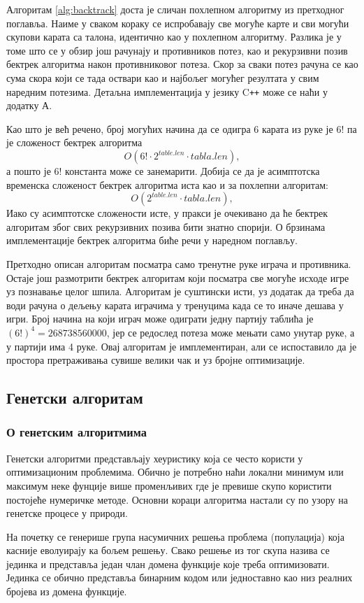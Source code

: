 \documentclass[a4paper, 12pt, ngerman]{article}
\let\oldsubsection\subsection
\renewcommand\subsection{\clearpage\oldsubsection}
\newcommand{\cpp}{C\texttt{++} }
\begin{document}
Алгоритам \ref{alg:backtrack} доста је сличан похлепном алгоритму из претходног поглавља. Наиме у сваком кораку се испробавају све могуће карте и сви могући скупови карата са талона, идентично као у похлепном алгоритму. Разлика је у томе што се у обзир још рачунају и противников потез, као и рекурзивни позив бектрек алгоритма након противниковог потеза. Скор за сваки потез рачуна се као сума скора који се тада оствари као и најбољег могућег резултата у свим наредним потезима. Детаљна имплементација у језику \cpp може се наћи у додатку А.

Као што је већ речено, број могућих начина да се одигра 6 карата из руке је $6!$ па је сложеност бектрек алгоритма
$$O(6! \cdot 2^{table.len} \cdot tabla.len), $$
а пошто је $6!$ константа може се занемарити. Добија се да је асимптотска временска сложеност бектрек алгоритма иста као и за похлепни алгоритам:
$$O(2^{table.len} \cdot tabla.len), $$
Иако су асимптотске сложености исте, у пракси је очекивано да ће бектрек алгоритам због свих рекурзивних позива бити знатно спорији. О брзинама имплементације бектрек алгоритма биће речи у наредном поглављу.

Претходно описан алгоритам посматра само тренутне руке играча и противника. Остаје још размотрити бектрек алгоритам који посматра све могуће исходе игре уз познавање целог шпила. Алгоритам је суштински исти, уз додатак да треба да води рачуна о дељењу карата играчима у тренуцима када се то иначе дешава у игри. Број начина на који играч може одиграти једну партију таблића је $(6!)^4 = 268738560000$, јер се редослед потеза може мењати само унутар руке, а у партији има 4 руке. Овај алгоритам је имплементиран, али се испоставило да је простора претраживања сувише велики чак и уз бројне оптимизације.

\subsection{Генетски алгоритам}
\subsubsection{О генетским алгоритмима}
Генетски алгоритми представљају хеуристику која се често користи у оптимизационим проблемима. Обично је потребно наћи локални минимум или максимум неке фунције више променљивих где је превише скупо користити постојеће нумеричке методе. Основни кораци алгоритма настали су по узору на генетске процесе у природи.

На почетку се генерише група насумичних решења проблема (популација) која касније еволуирају ка бољем решењу. Свако решење из тог скупа назива се јединка и представља један члан домена функције које треба оптимизовати. Јединка се обично представља бинарним кодом или једноставно као низ реалних бројева из домена функције.
\end{document}
